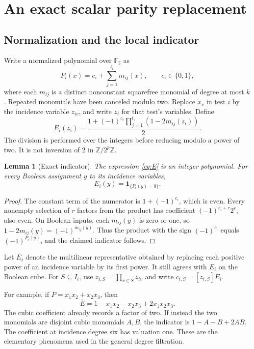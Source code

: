 \documentclass[11pt]{article}
\newtheorem{lemma}[theorem]{Lemma}
\theoremstyle{definition}
\theoremstyle{remark}
\newcommand{\F}{\mathbb F}
\newcommand{\Z}{\mathbb Z}
\newcommand{\ind}{\mathbf 1}
\begin{document}
\section{An exact scalar parity replacement}\label{sec:scalar}

\subsection{Normalization and the local indicator}
Write a normalized polynomial over $\F_2$ as
\[
 P_i(x)=c_i+\sum_{j=1}^{t_i}m_{ij}(x),\qquad c_i\in\{0,1\},
\]
where each $m_{ij}$ is a distinct nonconstant squarefree monomial of degree
at most $k$. Repeated monomials have been canceled modulo two. Replace
$x_v$ in test $i$ by the incidence variable $z_{iv}$, and write $z_i$ for
that test's variables. Define
\begin{equation}\label{eq:E}
 E_i(z_i)=\frac{1+(-1)^{c_i}
                    \prod_{j=1}^{t_i}(1-2m_{ij}(z_i))}{2}.
\end{equation}
The division is performed over the integers before reducing modulo a power of
two. It is not inversion of $2$ in $\Z/2^p\Z$.

\begin{lemma}[Exact indicator]\label{lem:indicator}
The expression \eqref{eq:E} is an integer polynomial. For every Boolean
assignment $y$ to its incidence variables,
\[
 E_i(y)=\ind_{\{P_i(y)=0\}}.
\]
\end{lemma}
\begin{proof}
The constant term of the numerator is $1+(-1)^{c_i}$, which is even.
Every nonempty selection of $r$ factors from the product has coefficient
$(-1)^{c_i+r}2^r$, also even. On Boolean inputs, each $m_{ij}(y)$ is
zero or one, so $1-2m_{ij}(y)=(-1)^{m_{ij}(y)}$. Thus the product with
the sign $(-1)^{c_i}$ equals $(-1)^{P_i(y)}$, and the claimed indicator
follows.
\end{proof}

Let $\overline E_i$ denote the multilinear representative obtained by
replacing each positive power of an incidence variable by its first power.
It still agrees with $E_i$ on the Boolean cube. For $S\subseteq I_i$, use
$z_{i,S}=\prod_{v\in S}z_{iv}$ and write
$c_{i,S}=[z_{i,S}]\overline E_i$.

For example, if $P=x_1x_2+x_2x_3$, then
\[
 \overline E=1-x_1x_2-x_2x_3+2x_1x_2x_3.
\]
The cubic coefficient already records a factor of two. If instead the two
monomials are disjoint cubic monomials $A,B$, the indicator is
$1-A-B+2AB$. The coefficient at incidence degree six has valuation one.
These are the elementary phenomena used in the general degree filtration.
\end{document}

